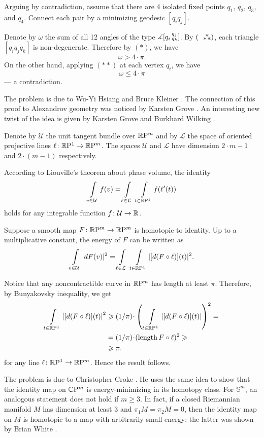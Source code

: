 Arguing by contradiction,
assume that there are 4 isolated fixed points $q_1$, $q_2$, $q_3$, and $q_4$.
Connect each pair by a minimizing geodesic $[q_iq_j]$.

Denote by $\omega$ the sum of all 12 angles of the type  $\measuredangle[q_i\,{}^{q_j}_{q_k}]$.
By $(\asterism)$, each triangle $[q_iq_jq_k]$ is non-degenerate.
Therefore by $({*})$, we have
\[\omega>4\cdot\pi.\]
On the other hand, applying $({*}{*})$ at each vertex $q_i$, we have 
\[\omega\le 4\cdot\pi\]
--- a contradiction.\qeds


The problem is due to 
Wu-Yi Hsiang 
and Bruce Kleiner 
\cite{hsiang-kleiner}.
The connection of this proof to Alexandrov geometry was noticed by Karsten Grove \cite{grove}.
An interesting new twist of the idea 
is given by 
Karsten Grove 
and Burkhard Wilking 
\cite{grove-wilking}.

Denote by $\mathcal{U}$ the unit tangent bundle over $\mathbb{R}\mathrm{P}^m$
and by $\mathcal{L}$ the space of oriented projective lines $\ell\colon\mathbb{R}\mathrm{P}^1\to \mathbb{R}\mathrm{P}^m$.
The spaces $\mathcal{U}$ and $\mathcal{L}$ 
have dimension $2\cdot m-1$ 
and $2\cdot(m-1)$
respectively.


According to Liouville's theorem about phase volume, the identity
\[\int\limits_{v\in \mathcal{U}}f(v)
=
\int\limits_{\ell\in\mathcal{L}}\ \int\limits_{t\in\mathbb{R}\mathrm{P}^1} f(\ell'(t))\]
holds for any integrable function $f\colon\mathcal{U}\to\mathbb{R}$.

Suppose a smooth map $F\colon\mathbb{R}\mathrm{P}^m\to\mathbb{R}\mathrm{P}^m$ is homotopic to identity.
Up to a multiplicative constant,
the energy of $F$ can be written as
\[\int\limits_{v\in\mathcal{U}} |dF(v)|^2
=
\int\limits_{\ell\in\mathcal{L}}\ \int\limits_{t\in\mathbb{R}\mathrm{P}^1} |[d(F\circ \ell)](t)|^2.\]

Notice that any noncontractible curve in $\mathbb{R}\mathrm{P}^m$ has length at least $\pi$.
Therefore, by Bunyakovsky inequality, we get
\begin{align*}
\int\limits_{t\in\RP^1} \left|[d(F\circ \ell)](t)\right|^2
&\ge 
\tfrac1\pi\cdot \left(\,\int\limits_{t\in\RP^1} \left|[d(F\circ \ell)](t)\right|\right)^2=
\\
&=\tfrac1\pi\cdot (\length F\circ\ell)^2\ge
\\
&\ge \pi.
\end{align*}
for any line $\ell\colon\mathbb{R}\mathrm{P}^1\to \mathbb{R}\mathrm{P}^m$.
Hence the result follows.\qeds

\label{page:liouville}
The problem is due to Christopher Croke \cite{croke-energy}. 
He uses the same idea to show that the identity map on $\mathbb{C}\mathrm{P}^m$ is energy-minimizing in its homotopy class.
For $\mathbb S^m$, an analogous statement does not hold if $m\ge 3$.
In fact, 
if a closed Riemannian manifold $M$ 
has dimension at least 3 
and $\pi_1M=\pi_2M=0$,
then the identity map on $M$ is homotopic 
to a map with arbitrarily small energy;
the latter was shown by Brian White \cite{white}.

